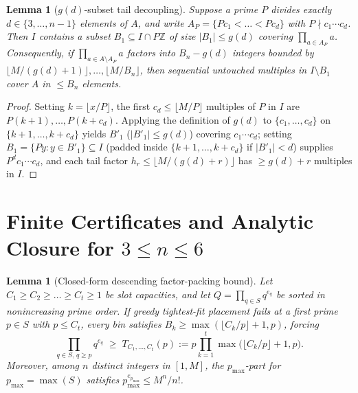 \documentclass[11pt]{article}
\newtheorem{lemma}[theorem]{Lemma}
\begin{document}
\begin{lemma}[$g(d)$-subset tail decoupling]
\label{lem:tail}
Suppose a prime $P$ divides exactly $d \in \{3, \dots, n - 1\}$ elements of $A$, and write $A_P = \{P c_1 < \dots < P c_d\}$ with $P \nmid c_1 \cdots c_d$. Then $I$ contains a subset $B_1 \subseteq I \cap P \mathbb{Z}$ of size $|B_1| \le g(d)$ covering $\prod_{a \in A_P} a$. Consequently, if $\prod_{a \in A \setminus A_P} a$ factors into $B_n - g(d)$ integers bounded by $\lfloor M / (g(d) + 1) \rfloor, \dots, \lfloor M / B_n \rfloor$, then sequential untouched multiples in $I \setminus B_1$ cover $A$ in $\le B_n$ elements.
\end{lemma}
\begin{proof}
Setting $k = \lfloor x / P \rfloor$, the first $c_d \le \lfloor M / P \rfloor$ multiples of $P$ in $I$ are $P(k + 1), \dots, P(k + c_d)$. Applying the definition of $g(d)$ to $\{c_1, \dots, c_d\}$ on $\{k + 1, \dots, k + c_d\}$ yields $B'_1$ ($|B'_1| \le g(d)$) covering $c_1 \cdots c_d$; setting $B_1 = \{P y : y \in B'_1\} \subseteq I$ (padded inside $\{k + 1, \dots, k + c_d\}$ if $|B'_1| < d$) supplies $P^d c_1 \cdots c_d$, and each tail factor $h_r \le \lfloor M / (g(d) + r) \rfloor$ has $\ge g(d) + r$ multiples in $I$.
\end{proof}

\section{Finite Certificates and Analytic Closure for $3 \le n \le 6$}

\begin{lemma}[Closed-form descending factor-packing bound]
\label{lem:ffd}
Let $C_1 \ge C_2 \ge \dots \ge C_t \ge 1$ be slot capacities, and let $Q = \prod_{q \in S} q^{e_q}$ be sorted in nonincreasing prime order. If greedy tightest-fit placement fails at a first prime $p \in S$ with $p \le C_t$, every bin satisfies $B_k \ge \max(\lfloor C_k / p \rfloor + 1, p)$, forcing
\[
\prod_{q \in S,\, q \ge p} q^{e_q} \;\ge\; T_{C_1, \dots, C_t}(p) := p \prod_{k = 1}^t \max\bigl(\lfloor C_k / p \rfloor + 1, p\bigr).
\]
Moreover, among $n$ distinct integers in $[1, M]$, the $p_{\max}$-part for $p_{\max} = \max(S)$ satisfies $p_{\max}^{e_{p_{\max}}} \le M^n / n!$.
\end{lemma}
\end{document}
